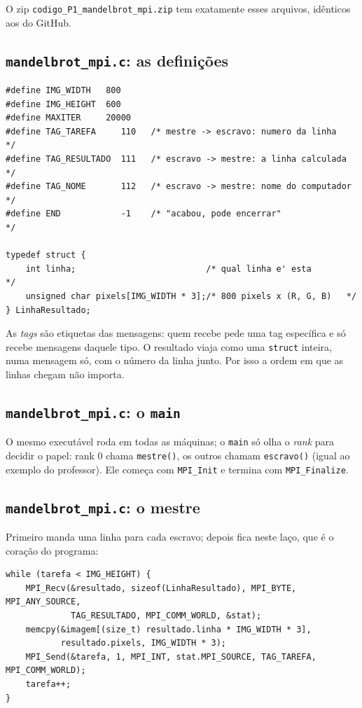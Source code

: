 \documentclass[a4paper,11pt]{article}
\begin{document}
O zip \texttt{codigo\_P1\_mandelbrot\_mpi.zip} tem exatamente esses arquivos, idênticos aos do GitHub.

\subsection{\texttt{mandelbrot\_mpi.c}: as definições}

\begin{lstlisting}
#define IMG_WIDTH   800
#define IMG_HEIGHT  600
#define MAXITER     20000
#define TAG_TAREFA     110   /* mestre -> escravo: numero da linha     */
#define TAG_RESULTADO  111   /* escravo -> mestre: a linha calculada   */
#define TAG_NOME       112   /* escravo -> mestre: nome do computador  */
#define END            -1    /* "acabou, pode encerrar"                */

typedef struct {
    int linha;                          /* qual linha e' esta        */
    unsigned char pixels[IMG_WIDTH * 3];/* 800 pixels x (R, G, B)   */
} LinhaResultado;
\end{lstlisting}

As \textit{tags} são etiquetas das mensagens: quem recebe pede uma tag específica e só recebe mensagens daquele tipo. O resultado viaja como uma \texttt{struct} inteira, numa mensagem só, com o número da linha junto. Por isso a ordem em que as linhas chegam não importa.

\subsection{\texttt{mandelbrot\_mpi.c}: o \texttt{main}}

O mesmo executável roda em todas as máquinas; o \texttt{main} só olha o \textit{rank} para decidir o papel: rank 0 chama \texttt{mestre()}, os outros chamam \texttt{escravo()} (igual ao exemplo do professor). Ele começa com \texttt{MPI\_Init} e termina com \texttt{MPI\_Finalize}.

\subsection{\texttt{mandelbrot\_mpi.c}: o mestre}

Primeiro manda uma linha para cada escravo; depois fica neste laço, que é o coração do programa:

\begin{lstlisting}
while (tarefa < IMG_HEIGHT) {
    MPI_Recv(&resultado, sizeof(LinhaResultado), MPI_BYTE, MPI_ANY_SOURCE,
             TAG_RESULTADO, MPI_COMM_WORLD, &stat);
    memcpy(&imagem[(size_t) resultado.linha * IMG_WIDTH * 3],
           resultado.pixels, IMG_WIDTH * 3);
    MPI_Send(&tarefa, 1, MPI_INT, stat.MPI_SOURCE, TAG_TAREFA, MPI_COMM_WORLD);
    tarefa++;
}
\end{lstlisting}
\end{document}
